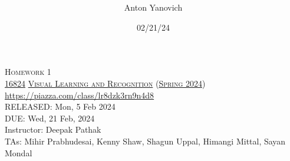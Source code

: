 \documentclass[11pt,addpoints,answers]{exam}
\title{\textsc{\hwName}} %
\author{Anton Yanovich}
\date{02/21/24}
\date{}
\numberwithin{equation}{section} %
\numberwithin{figure}{section} %
\numberwithin{table}{section} %
\newcommand{\courseNum}{\href{https://visual-learning.cs.cmu.edu/}{16824}}
\newcommand{\courseName}{\href{https://visual-learning.cs.cmu.edu/}{Visual Learning and Recognition}}
\newcommand{\courseSem}{\href{https://visual-learning.cs.cmu.edu/}{Spring 2024}}
\newcommand{\courseUrl}{{\url{https://piazza.com/class/lr8dzk3rn9n4d8}}}
\newcommand{\hwNum}{Homework 1}
\newcommand{\hwTopic}{Image Classification and Object Detection}
\newcommand{\outDate}{{Mon, 5 Feb 2024}}
\newcommand{\dueDate}{{Wed, 21 Feb, 2024}}
\newcommand{\instructorName}{{Deepak Pathak}}
\newcommand{\taNames}{{Mihir Prabhudesai, Kenny Shaw, Shagun Uppal, Himangi Mittal, Sayan Mondal}}
\begin{document}
\section*{}
\begin{center}
  \textsc{\LARGE \hwNum} \\
  \vspace{1em}
  \textsc{\large \courseNum{} \courseName{} (\courseSem)} \\
  \courseUrl\\
  \vspace{1em}
  RELEASED: \outDate \\
  DUE: \dueDate \\
  Instructor: \instructorName \\
  TAs: \taNames
\end{center}
\end{document}
